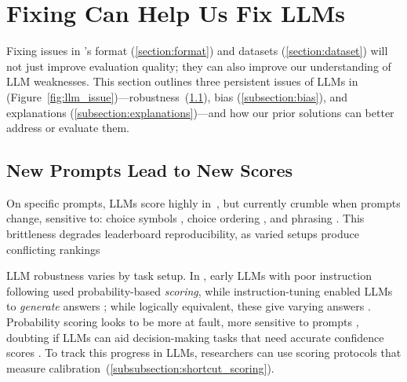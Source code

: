 

\section{Fixing \mcqa Can Help Us Fix LLMs} \label{section:models}

Fixing issues in \mcqa's format (\cref{section:format}) and datasets (\cref{section:dataset}) will not just improve evaluation quality; they can also improve our understanding of LLM weaknesses.
This section outlines three persistent
issues of LLMs in \mcqa (Figure~\ref{fig:llm_issue})---robustness~(\cref{subsection:robustness}), bias
(\cref{subsection:bias}), and explanations
(\cref{subsection:explanations})---and how our prior solutions can better address or evaluate them.


\subsection{New Prompts Lead to New \mcqa Scores} \label{subsection:robustness}


On specific prompts, LLMs score highly in~\mcqa, but currently crumble
when prompts change, sensitive to: choice
symbols \cite{alzahrani2024benchmarks}, choice
ordering \cite{Zheng2023LargeLM}, and
phrasing \cite{Wiegreffe2023IncreasingPM}.
This brittleness degrades \mcqa leaderboard reproducibility, as varied setups produce conflicting rankings~\cite{gu2024olmes}


LLM robustness varies by task setup.
%
In \mcqa, early LLMs with poor instruction
following \cite{zhang2022opt} used probability-based \textit{scoring},
while instruction-tuning enabled LLMs to \textit{generate}
answers \cite{longpre2023flan}; while logically equivalent, these give varying answers \cite{lyu2024beyond}. 
Probability scoring looks to be more at fault, more sensitive to prompts \cite{wang2024look}, doubting if LLMs can aid decision-making tasks that need accurate confidence scores \cite{liu2024dellma}.
To track this progress in LLMs, researchers can use \mcqa scoring protocols that measure calibration~(\cref{subsubsection:shortcut_scoring}).

